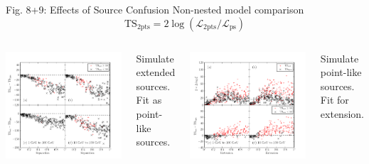\documentclass[12pt]{beamer}
\begin{document}
\begin{frame}{Fig. 8+9: Effects of Source Confusion}
  Non-nested model comparison
  \begin{equation*}
    \text{TS}_\text{2pts} = 2 \log(\mathcal{L}_\text{2pts}/\mathcal{L}_\text{ps})
  \end{equation*}

  \begin{columns}
    \includegraphics[scale=0.30]{plots/confusion_2pts_plot_color.pdf}

    Simulate extended sources. Fit as point-like sources.

    \includegraphics[scale=0.30]{plots/confusion_extended_plot_color.pdf}

    Simulate point-like sources. Fit for extension.
  \end{columns}
\end{frame}
\end{document}
